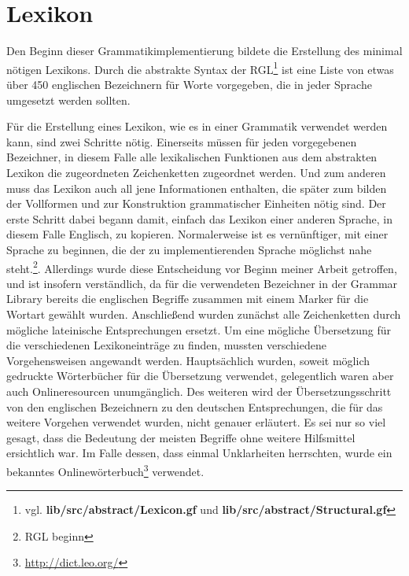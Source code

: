 \documentclass[12pt,abstract=on]{scrreprt}
\begin{document}
\section{Lexikon}
Den Beginn dieser Grammatikimplementierung bildete die Erstellung des minimal nötigen Lexikons. Durch die abstrakte Syntax der RGL\footnote{vgl. \textbf{lib/src/abstract/Lexicon.gf} und \textbf{lib/src/abstract/Structural.gf}} ist eine Liste von etwas über 450 englischen Bezeichnern für Worte vorgegeben, die in jeder Sprache umgesetzt werden sollten. \par
Für die Erstellung eines Lexikon, wie es in einer Grammatik verwendet werden kann, sind zwei Schritte nötig. Einerseits müssen für jeden vorgegebenen Bezeichner, in diesem Falle alle lexikalischen Funktionen aus dem abstrakten Lexikon die zugeordneten Zeichenketten zugeordnet werden. Und zum anderen muss das Lexikon auch all jene Informationen enthalten, die später zum bilden der Vollformen und zur Konstruktion grammatischer Einheiten nötig sind.
Der erste Schritt dabei begann damit, einfach das Lexikon einer anderen Sprache, in diesem Falle Englisch, zu kopieren. Normalerweise ist es vernünftiger, mit einer Sprache zu beginnen, die der zu implementierenden Sprache möglichst nahe steht.\footnote{RGL beginn}. Allerdings wurde diese Entscheidung vor Beginn meiner Arbeit getroffen, und ist insofern verständlich, da für die verwendeten Bezeichner in der Grammar Library bereits die englischen Begriffe zusammen mit einem Marker für die Wortart gewählt wurden. Anschließend wurden zunächst alle Zeichenketten durch mögliche lateinische Entsprechungen ersetzt. Um eine mögliche Übersetzung für die verschiedenen Lexikoneinträge zu finden, mussten verschiedene Vorgehensweisen angewandt werden. Hauptsächlich wurden, soweit möglich gedruckte Wörterbücher für die Übersetzung verwendet, gelegentlich waren aber auch Onlineresourcen unumgänglich. Des weiteren wird der Übersetzungsschritt von den englischen Bezeichnern zu den deutschen Entsprechungen, die für das weitere Vorgehen verwendet wurden, nicht genauer erläutert. Es sei nur so viel gesagt, dass die Bedeutung der meisten Begriffe ohne weitere Hilfsmittel ersichtlich war. Im Falle dessen, dass einmal Unklarheiten herrschten, wurde ein bekanntes Onlinewörterbuch\footnote{\url{http://dict.leo.org/}} verwendet.\par
\end{document}
